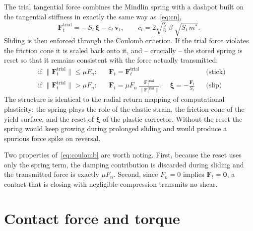 The trial tangential force combines the Mindlin spring with a dashpot built on
the tangential stiffness in exactly the same way as~\eqref{eq:cn},
\begin{equation}
  \mathbf{F}_{t}^{\mathrm{trial}}
  = -\,S_{t}\,\boldsymbol{\xi} - c_{t}\,\mathbf{v}_{t},
  \qquad
  c_{t} = 2\sqrt{\tfrac{5}{6}}\;\beta\;\sqrt{S_{t}\,m^{*}} .
  \label{eq:Ft-trial}
\end{equation}
Sliding is then enforced through the Coulomb criterion.  If the trial force
violates the friction cone it is scaled back onto it, and -- crucially -- the
stored spring is reset so that it remains consistent with the force actually
transmitted:
\begin{equation}
  \boxed{\;
  \begin{aligned}
    &\text{if } \lVert \mathbf{F}_{t}^{\mathrm{trial}}\rVert \le \mu F_{n}:
      &&\mathbf{F}_{t} = \mathbf{F}_{t}^{\mathrm{trial}}
        &&\text{(stick)}\\[2pt]
    &\text{if } \lVert \mathbf{F}_{t}^{\mathrm{trial}}\rVert > \mu F_{n}:
      &&\mathbf{F}_{t}
        = \mu F_{n}\,
          \frac{\mathbf{F}_{t}^{\mathrm{trial}}}
               {\lVert \mathbf{F}_{t}^{\mathrm{trial}}\rVert},
      \quad
      \boldsymbol{\xi} = -\frac{\mathbf{F}_{t}}{S_{t}}
        &&\text{(slip)}
  \end{aligned}\;}
  \label{eq:coulomb}
\end{equation}
The structure is identical to the radial return mapping of computational
plasticity: the spring plays the role of the elastic strain, the friction cone
of the yield surface, and the reset of $\boldsymbol{\xi}$ of the plastic
corrector.  Without the reset the spring would keep growing during prolonged
sliding and would produce a spurious force spike on reversal.

Two properties of~\eqref{eq:coulomb} are worth noting.  First, because the reset
uses only the spring term, the damping contribution is discarded during sliding
and the transmitted force is exactly $\mu F_{n}$.  Second, since $F_{n}=0$
implies $\mathbf{F}_{t}=\mathbf{0}$, a contact that is closing with negligible
compression transmits no shear.

\section{Contact force and torque}
\label{sec:torque}

